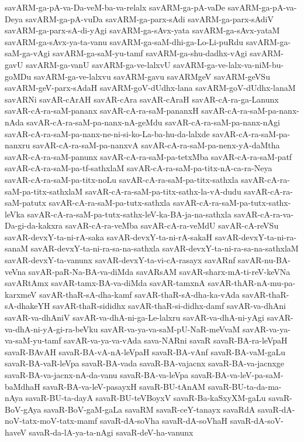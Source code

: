 {savARM-ga-pA-va-Da-veM-ba-va-relalx
savARM-ga-pA-vaDe
savARM-ga-pA-va-Deya
savARM-ga-pA-vuDa
savARM-ga-parx-sAdi
savARM-ga-parx-sAdiV
savARM-ga-parx-sA-di-yAgi
savARM-ga-sAvx-yata
savARM-ga-sAvx-yataM
savARM-ga-sAvx-ya-ta-vanu
savARM-ga-saM-dhi-ga-Lo-Li-puRdu
savARM-ga-saM-ga-vAgi
savARM-ga-saM-yu-tamf
savARM-ga-shu-dadhx-vAgi
savARM-gavU
savARM-ga-vanU
savARM-ga-ve-lalxvU
savARM-ga-ve-lalx-va-niM-bu-goMDu
savARM-ga-ve-lalxvu
savARM-gavu
savARMgeV
savARM-geVSu
savARM-geV-parx-sAdaH
savARM-goV-dUdhx-lana
savARM-goV-dUdhx-lanaM
savARNi
savAR-cArAH
savAR-cAra
savAR-cAraH
savAR-cA-ra-ga-Lanunx
savAR-cA-ra-saM-pananx
savAR-cA-ra-saM-pananxH
savAR-cA-ra-saM-pa-nanx-nAda
savAR-cA-ra-saM-pa-nanx-nA-geMdu
savAR-cA-ra-saM-pa-nanx-nAgi
savAR-cA-ra-saM-pa-nanx-ne-ni-si-ko-La-ba-hu-da-lalxde
savAR-cA-ra-saM-pa-nanxru
savAR-cA-ra-saM-pa-nanxvA
savAR-cA-ra-saM-pa-nenx-yA-daMtha
savAR-cA-ra-saM-panunx
savAR-cA-ra-saM-pa-tetxMba
savAR-cA-ra-saM-patf
savAR-cA-ra-saM-pa-tf-sathxlaM
savAR-cA-ra-saM-pa-titx-nA-ca-ra-Neya
savAR-cA-ra-saM-pa-titx-noLu
savAR-cA-ra-saM-pa-titx-sathxla
savAR-cA-ra-saM-pa-titx-sathxlaM
savAR-cA-ra-saM-pa-titx-sathx-la-vA-dudu
savAR-cA-ra-saM-patutx
savAR-cA-ra-saM-pa-tutx-sathxla
savAR-cA-ra-saM-pa-tutx-sathx-leVka
savAR-cA-ra-saM-pa-tutx-sathx-leV-ka-BA-ja-na-sathxla
savAR-cA-ra-va-Da-gi-da-kakxra
savAR-cA-ra-veMba
savAR-cA-ra-veMdU
savAR-cA-reVSu
savAR-devxY-ta-ni-rA-saka
savAR-devxY-ta-ni-rA-sakaH
savAR-devxY-ta-ni-ra-sanaM
savAR-devxY-ta-ni-ra-sa-na-sathxla
savAR-devxY-ta-ni-ra-sa-na-sathxlaM
savAR-devxY-ta-vanunx
savAR-devxY-ta-vi-cA-rasayx
savARnf
savAR-nu-BA-veVna
savAR-paR-Na-BA-va-diMda
savARsAM
savAR-sharx-mA-ti-reV-keVNa
savARtAmx
savAR-tamx-BA-va-diMda
savAR-tamxnA
savAR-thAR-nA-mu-pa-karxmeV
savAR-thaR-sA-dha-kamf
savAR-thaR-sA-dha-ka-vAda
savAR-thaR-sA-dhakeYH
savAR-thaR-sididhx
savAR-thaR-si-didhx-damf
savAR-va-dhAni
savAR-va-dhAniV
savAR-va-dhA-ni-ga-Le-lalxru
savAR-va-dhA-ni-yAgi
savAR-va-dhA-ni-yA-gi-ra-beVku
savAR-va-ya-va-saM-pU-NaR-meVvaM
savAR-va-ya-va-saM-yu-tamf
savAR-va-ya-va-vAda
sava-NARni
savaR
savaR-BA-ra-leVpaH
savaR-BAvAH
savaR-BA-vA-nA-leVpaH
savaR-BA-vAnf
savaR-BA-vaM-gaLu
savaR-BA-vaR-leVpa
savaR-BA-vada
savaR-BA-vajacnx
savaR-BA-va-jacnxge
savaR-BA-va-jacnx-nA-da-vanu
savaR-BA-va-leVpa
savaR-BA-va-leV-pa-saM-baMdhaH
savaR-BA-va-leV-pasayxH
savaR-BU-tAnAM
savaR-BU-ta-da-ma-nAya
savaR-BU-ta-dayA
savaR-BU-teVBoyxV
savaR-Ba-kaSxyXM-gaLu
savaR-BoV-gAya
savaR-BoV-gaM-gaLa
savaRM
savaR-ceY-tanayx
savaRdA
savaR-dA-noV-tatx-moV-tatx-mamf
savaR-dA-soVha
savaR-dA-soVhaH
savaR-dA-soV-haveV
savaR-da-lA-ya-ta-nAgi
savaR-deV-ha-vanunx
}

